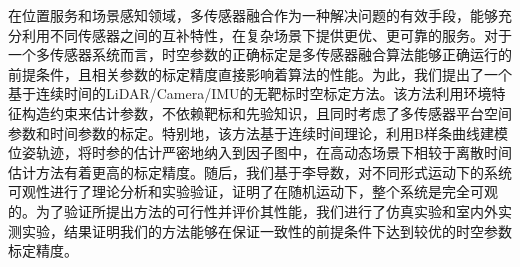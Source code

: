 
在位置服务和场景感知领域，多传感器融合作为一种解决问题的有效手段，能够充分利用不同传感器之间的互补特性，在复杂场景下提供更优、更可靠的服务。对于一个多传感器系统而言，时空参数的正确标定是多传感器融合算法能够正确运行的前提条件，且相关参数的标定精度直接影响着算法的性能。为此，我们提出了一个基于连续时间的LiDAR/Camera/IMU的无靶标时空标定方法。该方法利用环境特征构造约束来估计参数，不依赖靶标和先验知识，且同时考虑了多传感器平台空间参数和时间参数的标定。特别地，该方法基于连续时间理论，利用B样条曲线建模位姿轨迹，将时参的估计严密地纳入到因子图中，在高动态场景下相较于离散时间估计方法有着更高的标定精度。随后，我们基于李导数，对不同形式运动下的系统可观性进行了理论分析和实验验证，证明了在随机运动下，整个系统是完全可观的。为了验证所提出方法的可行性并评价其性能，我们进行了仿真实验和室内外实测实验，结果证明我们的方法能够在保证一致性的前提条件下达到较优的时空参数标定精度。